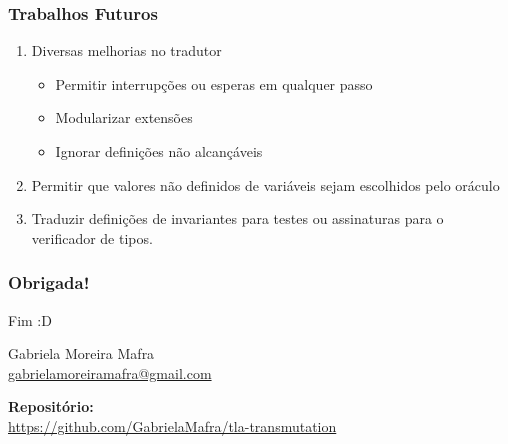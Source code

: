 \documentclass{beamer}
\begin{document}
\begin{frame}
  \frametitle{Trabalhos Futuros}
  \begin{enumerate}
    \item Diversas melhorias no tradutor
    \begin{itemize}
        \item Permitir interrupções ou esperas em qualquer passo
        \item Modularizar extensões
        \item Ignorar definições não alcançáveis
        \end{itemize}
    \item Permitir que valores não definidos de variáveis sejam escolhidos
      pelo oráculo
    \item Traduzir definições de invariantes para testes ou assinaturas para o
      verificador de tipos.
  \end{enumerate}
\end{frame}

\begin{frame}
  \frametitle{Obrigada!}

  {\Huge Fim :D}\bigskip

  Gabriela Moreira Mafra\\\smallskip
  {\url{gabrielamoreiramafra@gmail.com}}\\\bigskip

  \textbf{Repositório:}\\
  {\url{https://github.com/GabrielaMafra/tla-transmutation}}

\end{frame}
\end{document}
